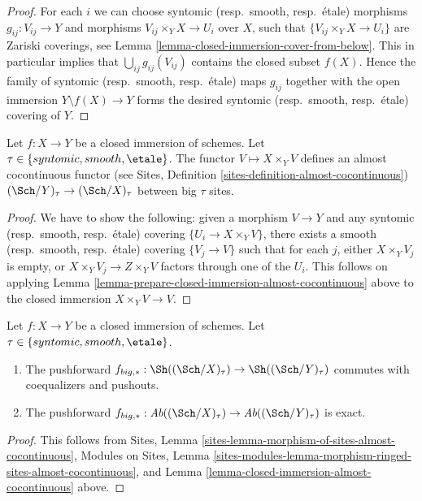 \begin{proof}
For each $i$ we can choose syntomic (resp.\ smooth, resp.\ \'etale) morphisms
$g_{ij} : V_{ij} \to Y$ and morphisms $V_{ij} \times_Y X \to U_i$ over $X$,
such that $\{V_{ij} \times_Y X \to U_i\}$ are Zariski coverings, see
Lemma \ref{lemma-closed-immersion-cover-from-below}.
This in particular implies that
$\bigcup_{ij} g_{ij}(V_{ij})$ contains the closed subset $f(X)$.
Hence the family of syntomic (resp.\ smooth, resp.\ \'etale) maps $g_{ij}$
together with the open immersion $Y \setminus f(X) \to Y$ forms the desired
syntomic (resp.\ smooth, resp.\ \'etale) covering of $Y$.
\end{proof}

\begin{lemma}
\label{lemma-closed-immersion-almost-cocontinuous}
Let $f : X \to Y$ be a closed immersion of schemes.
Let $\tau \in \{syntomic, smooth, \etale\}$.
The functor $V \mapsto X \times_Y V$ defines an almost
cocontinuous functor (see
Sites, Definition \ref{sites-definition-almost-cocontinuous})
$(\Sch/Y)_\tau \to (\Sch/X)_\tau$ between
big $\tau$ sites.
\end{lemma}

\begin{proof}
We have to show the following: given a morphism $V \to Y$
and any syntomic (resp.\ smooth, resp.\ \'etale)
covering $\{U_i \to X \times_Y V\}$, there exists a
smooth (resp.\ smooth, resp.\ \'etale) covering $\{V_j \to V\}$
such that for each $j$, either $X \times_Y V_j$ is empty, or
$X \times_Y V_j \to Z \times_Y V$ factors through one of
the $U_i$. This follows on applying
Lemma \ref{lemma-prepare-closed-immersion-almost-cocontinuous}
above to the closed immersion $X \times_Y V \to V$.
\end{proof}

\begin{lemma}
\label{lemma-closed-immersion-pushforward-exact}
Let $f : X \to Y$ be a closed immersion of schemes.
Let $\tau \in \{syntomic, smooth, \etale\}$.
\begin{enumerate}
\item The pushforward
$f_{big, *} :
\Sh((\Sch/X)_\tau)
\to
\Sh((\Sch/Y)_\tau)$
commutes with coequalizers and pushouts.
\item The pushforward
$f_{big, *} :
\textit{Ab}((\Sch/X)_\tau)
\to
\textit{Ab}((\Sch/Y)_\tau)$
is exact.
\end{enumerate}
\end{lemma}

\begin{proof}
This follows from
Sites, Lemma \ref{sites-lemma-morphism-of-sites-almost-cocontinuous},
Modules on Sites,
Lemma \ref{sites-modules-lemma-morphism-ringed-sites-almost-cocontinuous},
and
Lemma \ref{lemma-closed-immersion-almost-cocontinuous}
above.
\end{proof}

